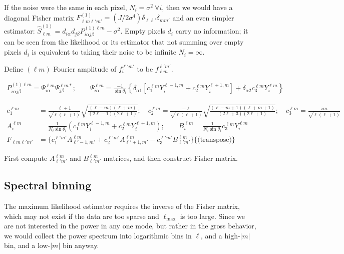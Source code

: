 \documentclass[prd,aps,10pt,nofootinbib,twocolumn,superscriptaddress,preprintnumbers,balancelastpage,longbibliography]{revtex4-1}
\begin{document}
If the noise were the same in each pixel, $N_i = \sigma^2~ \forall i$, then we would have a diagonal Fisher matrix $F^{(1)}_{\ell m \ell' m'} = (J/2\sigma^4)\delta_{\ell \ell'} \delta_{m m'}$ and an even simpler estimator: $\hat{S}^{(1)}_{\ell m} = d_{i \alpha} d_{j \beta} P^{(1)\ell m}_{i \alpha j \beta} - \sigma^2$. Empty pixels $d_i$ carry no information; it can be seen from the likelihood or its estimator that not summing over empty pixels $d_i$ is equivalent to taking their noise to be infinite $N_i = \infty$.

Define $(\ell m)$ Fourier amplitude of $f^{\ell' m'}_i$ to be $f_{\ell m}^{\ell' m'}$. 
\begin{widetext}
\begin{align}
P^{(1) \ell m}_{i\alpha j \beta} = \Psi^{\ell m}_{i\alpha} \Psi^{\ell m *}_{j \beta}; \qquad 
\Psi^{\ell m}_{i \alpha} = \frac{-1}{\sin \theta_i} \left\lbrace \delta_{\alpha 1} \left[ c^{\ell m}_1 Y^{\ell-1, m}_i + c^{\ell m}_2 Y^{\ell+1, m}_i \right] + \delta_{\alpha 2} c^{\ell m}_3 Y^{\ell m}_i \right\rbrace 
\end{align}
\end{widetext}

\begin{widetext}
\begin{align}
c^{\ell m}_1 &= \frac{\ell + 1}{\sqrt{\ell(\ell+1)}} \sqrt{\frac{(\ell - m)(\ell + m)}{(2\ell -1)(2\ell +1)}}; \quad
c^{\ell m}_2 = \frac{-\ell}{\sqrt{\ell(\ell+1)}} \sqrt{\frac{(\ell - m+1)(\ell + m+1)}{(2\ell +3)(2\ell +1)}}; \quad
c^{\ell m}_3 = \frac{i m}{\sqrt{\ell(\ell+1)}} \\
A^{\ell m}_i &= \frac{1}{N_i \sin \theta_i} \left( c^{\ell m}_1 Y^{\ell-1,m}_i + c^{\ell m}_2 Y^{\ell+1,m}_i \right); \qquad 
B^{\ell m}_i = \frac{1}{N_i \sin \theta_i} c^{\ell m}_3 Y^{\ell m}_i\\ 
F_{\ell m \ell' m'} &=  \big\lbrace c^{\ell' m'}_1 A^{\ell m}_{\ell'-1,m'} + c^{\ell' m'}_2 A^{\ell m}_{\ell'+1,m'} - c^{\ell' m'}_3 B^{\ell m}_{\ell' m'} \big\rbrace \big\lbrace \text{(transpose)} \big\rbrace
\end{align}
\end{widetext}

First compute $A^{\ell m}_{\ell' m'}$ and $B^{\ell m}_{\ell' m'}$ matrices, and then construct Fisher matrix.

\subsection{Spectral binning}
The maximum likelihood estimator requires the inverse of the Fisher matrix, which may not exist if the data are too sparse and $\ell_\text{max}$ is too large. Since we are not interested in the power in any one mode, but rather in the gross behavior, we would collect the power spectrum into logarithmic bins in $\ell$, and a high-$|m|$ bin, and a low-$|m|$ bin anyway.
\end{document}

